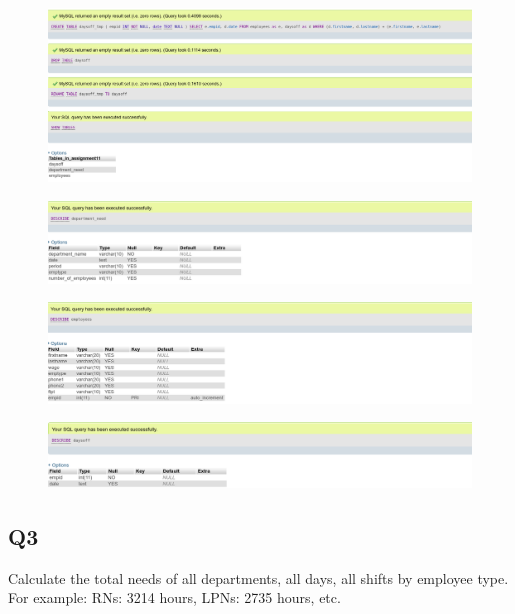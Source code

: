 \documentclass[11pt]{article}
\makeatletter
\def\maxwidth{\ifdim\Gin@nat@width>\linewidth\linewidth
    \else\Gin@nat@width\fi}
\let\Oldincludegraphics\includegraphics
\renewcommand{\includegraphics}[1]{\Oldincludegraphics[width=.8\maxwidth]{#1}}
\makeatother
\begin{document}
\begin{figure}[H]
\centering
\includegraphics{4.png}
\caption{}
\end{figure}

\begin{figure}[H]
\centering
\includegraphics{5.png}
\caption{}
\end{figure}

\begin{figure}[H]
\centering
\includegraphics{6.png}
\caption{}
\end{figure}

\begin{figure}[H]
\centering
\includegraphics{7.png}
\caption{}
\end{figure}

    \subsection*{Q3}\label{q3}

Calculate the total needs of all departments, all days, all shifts by
employee type. For example: RNs: 3214 hours, LPNs: 2735 hours, etc.
\end{document}
